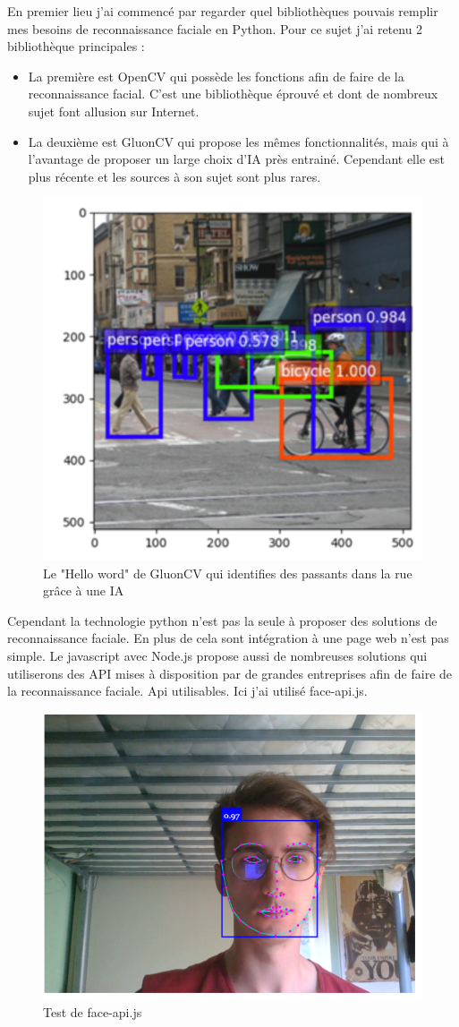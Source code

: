 En premier lieu j’ai commencé par regarder quel bibliothèques pouvais remplir mes besoins de reconnaissance faciale en Python. 
Pour ce sujet j’ai retenu 2 bibliothèque principales :
\begin{itemize}
    \item La première est OpenCV qui possède les fonctions afin de faire de la reconnaissance facial. C’est une bibliothèque éprouvé et dont de nombreux sujet font allusion sur Internet.
    \item La deuxième est GluonCV qui propose les mêmes fonctionnalités, mais qui à l’avantage de proposer un large choix d’IA près entrainé. Cependant elle est plus récente et les sources à son sujet sont plus rares.
\end{itemize}

\begin{figure}[h]
    \centering
    \includegraphics[width=.8\linewidth]{Figures/GluonCV_start.png}
    \caption{Le "Hello word" de GluonCV qui identifies des passants dans la rue grâce à une IA}
\end{figure}

Cependant la technologie python n’est pas la seule à proposer des solutions de reconnaissance faciale. En plus de cela sont intégration à une page web n’est pas simple.
Le javascript avec Node.js propose aussi de nombreuses solutions qui utiliserons des API mises à disposition par de grandes entreprises afin de faire de la reconnaissance faciale.
Api utilisables. Ici j'ai utilisé face-api.js.

\begin{figure}[h]
    \centering
    \includegraphics[width=.8\linewidth]{Figures/face-api.png}
    \caption{Test de face-api.js}
\end{figure}




